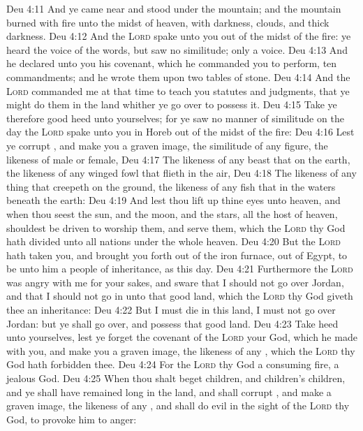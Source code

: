 \vs Deu 4:11 And ye came near and stood under the mountain; and the mountain burned with fire unto the midst of heaven, with darkness, clouds, and thick darkness.
\vs Deu 4:12 And the \textsc{Lord} spake unto you out of the midst of the fire: ye heard the voice of the words, but saw no similitude; only  a voice.
\vs Deu 4:13 And he declared unto you his covenant, which he commanded you to perform,  ten commandments; and he wrote them upon two tables of stone.
\vs Deu 4:14 And the \textsc{Lord} commanded me at that time to teach you statutes and judgments, that ye might do them in the land whither ye go over to possess it.
\vs Deu 4:15 Take ye therefore good heed unto yourselves; for ye saw no manner of similitude on the day  the \textsc{Lord} spake unto you in Horeb out of the midst of the fire:
\vs Deu 4:16 Lest ye corrupt , and make you a graven image, the similitude of any figure, the likeness of male or female,
\vs Deu 4:17 The likeness of any beast that  on the earth, the likeness of any winged fowl that flieth in the air,
\vs Deu 4:18 The likeness of any thing that creepeth on the ground, the likeness of any fish that  in the waters beneath the earth:
\vs Deu 4:19 And lest thou lift up thine eyes unto heaven, and when thou seest the sun, and the moon, and the stars,  all the host of heaven, shouldest be driven to worship them, and serve them, which the \textsc{Lord} thy God hath divided unto all nations under the whole heaven.
\vs Deu 4:20 But the \textsc{Lord} hath taken you, and brought you forth out of the iron furnace,  out of Egypt, to be unto him a people of inheritance, as  this day.
\vs Deu 4:21 Furthermore the \textsc{Lord} was angry with me for your sakes, and sware that I should not go over Jordan, and that I should not go in unto that good land, which the \textsc{Lord} thy God giveth thee  an inheritance:
\vs Deu 4:22 But I must die in this land, I must not go over Jordan: but ye shall go over, and possess that good land.
\vs Deu 4:23 Take heed unto yourselves, lest ye forget the covenant of the \textsc{Lord} your God, which he made with you, and make you a graven image,  the likeness of any , which the \textsc{Lord} thy God hath forbidden thee.
\vs Deu 4:24 For the \textsc{Lord} thy God  a consuming fire,  a jealous God.
\vs Deu 4:25 When thou shalt beget children, and children's children, and ye shall have remained long in the land, and shall corrupt , and make a graven image,  the likeness of any , and shall do evil in the sight of the \textsc{Lord} thy God, to provoke him to anger:
